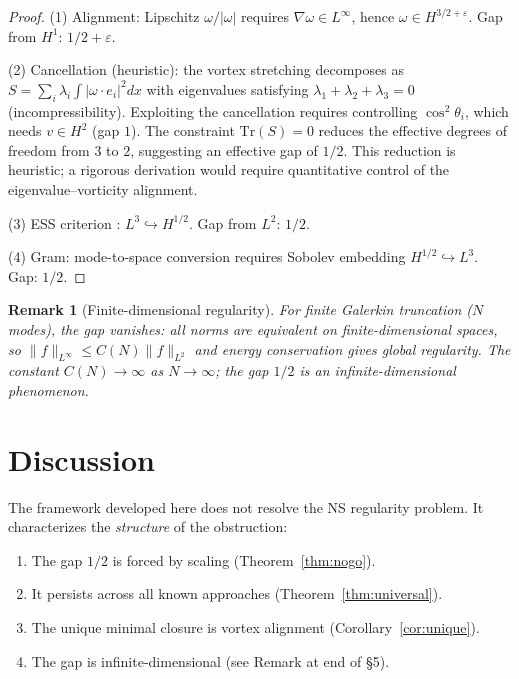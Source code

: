 \documentclass[12pt]{article}
\newtheorem{remark}[theorem]{Remark}
\begin{document}
\begin{proof}
(1) Alignment: Lipschitz $\omega/|\omega|$ requires
$\nabla\omega \in L^\infty$, hence $\omega \in H^{3/2+\varepsilon}$.
Gap from $H^1$: $1/2 + \varepsilon$.

(2) Cancellation (heuristic): the vortex stretching
decomposes as
$S = \sum_i \lambda_i \int |\omega \cdot e_i|^2 dx$
with eigenvalues satisfying
$\lambda_1 + \lambda_2 + \lambda_3 = 0$ (incompressibility).
Exploiting the cancellation requires controlling
$\cos^2\theta_i$, which needs $v \in H^2$ (gap $1$).
The constraint $\mathrm{Tr}(S) = 0$ reduces the
effective degrees of freedom from $3$ to $2$,
suggesting an effective gap of $1/2$.
This reduction is heuristic; a rigorous derivation
would require quantitative control of the
eigenvalue--vorticity alignment.

(3) ESS criterion \cite{ess2003}: $L^3 \hookrightarrow H^{1/2}$.
Gap from $L^2$: $1/2$.

(4) Gram: mode-to-space conversion requires Sobolev
embedding $H^{1/2} \hookrightarrow L^3$. Gap: $1/2$.
\end{proof}

\begin{remark}[Finite-dimensional regularity]
For finite Galerkin truncation ($N$ modes),
the gap vanishes: all norms are equivalent on
finite-dimensional spaces, so
$\|f\|_{L^\infty} \leq C(N) \|f\|_{L^2}$
and energy conservation gives global regularity.
The constant $C(N) \to \infty$ as $N \to \infty$;
the gap $1/2$ is an infinite-dimensional phenomenon.
\end{remark}

\section{Discussion}

The framework developed here does not resolve the
NS regularity problem. It characterizes the
\emph{structure} of the obstruction:

\begin{enumerate}
\item The gap $1/2$ is forced by scaling (Theorem~\ref{thm:nogo}).
\item It persists across all known approaches
  (Theorem~\ref{thm:universal}).
\item The unique minimal closure is vortex alignment
  (Corollary~\ref{cor:unique}).
\item The gap is infinite-dimensional
  (see Remark at end of \S5).
\end{enumerate}
\end{document}
